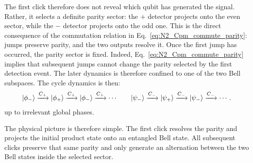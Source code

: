 The first click therefore does not reveal which qubit has generated the signal. Rather, it selects a definite parity sector: the \(+\) detector projects onto the even sector, while the \(-\) detector projects onto the odd one. This is the direct consequence of the commutation relation in Eq.~\eqref{eq:N2_Cpm_commute_parity}: jumps preserve parity, and the two outputs resolve it.
Once the first jump has occurred, the parity sector is fixed. Indeed, Eq.~\eqref{eq:N2_Cpm_commute_parity} implies that subsequent jumps cannot change the parity selected by the first detection event. The later dynamics is therefore confined to one of the two Bell subspaces. The cycle dynamics is then:
\begin{equation}
	\ket{\phi_-}\xrightarrow{C_+}\ket{\phi_+}\xrightarrow{C_+}\ket{\phi_-}\xrightarrow{C_+}\cdots \qquad 
	\ket{\psi_-}\xrightarrow{C_-}\ket{\psi_+}\xrightarrow{C_-}\ket{\psi_-}\xrightarrow{C_-}\cdots.
	\label{eq:N2_even_cycle}
\end{equation}
up to irrelevant global phases. 

The physical picture is therefore simple. The first click resolves the parity and projects the initial product state onto an entangled Bell state. All subsequent clicks preserve that same parity and only generate an alternation between the two Bell states inside the selected sector.

